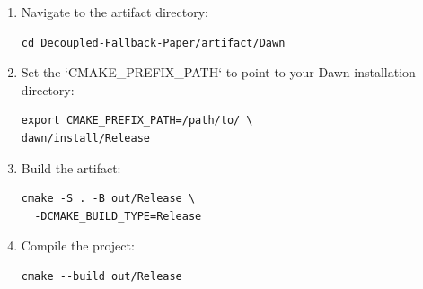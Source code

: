\documentclass[sigconf]{acmart}
\begin{document}
\begin{enumerate}
  \item Navigate to the artifact directory:
        \begin{lstlisting}[basicstyle=\ttfamily\small, frame=single]
cd Decoupled-Fallback-Paper/artifact/Dawn
  \end{lstlisting}

  \item Set the `CMAKE\_PREFIX\_PATH` to point to your Dawn installation directory:
        \begin{lstlisting}[basicstyle=\ttfamily\small, frame=single]
export CMAKE_PREFIX_PATH=/path/to/ \
dawn/install/Release
  \end{lstlisting}

  \item Build the artifact:
        \begin{lstlisting}[basicstyle=\ttfamily\small, frame=single]
cmake -S . -B out/Release \
  -DCMAKE_BUILD_TYPE=Release
  \end{lstlisting}

  \item Compile the project:
        \begin{lstlisting}[basicstyle=\ttfamily\small, frame=single]
cmake --build out/Release
  \end{lstlisting}
\end{enumerate}
\end{document}
